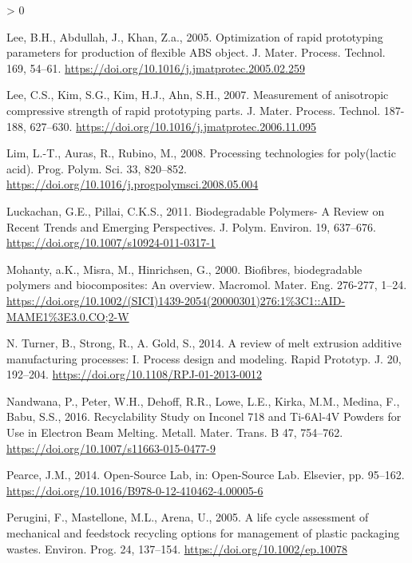 \documentclass[
]{article}
\newlength{\cslhangindent}
\newenvironment{CSLReferences}[2] %
 {%
  \setlength{\parindent}{0pt}
  \ifodd #1 \everypar{\setlength{\hangindent}{\cslhangindent}}\ignorespaces\fi
  \ifnum #2 > 0
  \setlength{\parskip}{#2\baselineskip}
  \fi
 }%
 {}
\begin{document}
\begin{CSLReferences}{1}{0}
\leavevmode\hypertarget{ref-Lee2005}{}%
Lee, B.H., Abdullah, J., Khan, Z.a., 2005. {Optimization of rapid
prototyping parameters for production of flexible ABS object}. J. Mater.
Process. Technol. 169, 54--61.
\url{https://doi.org/10.1016/j.jmatprotec.2005.02.259}

\leavevmode\hypertarget{ref-Lee2007}{}%
Lee, C.S., Kim, S.G., Kim, H.J., Ahn, S.H., 2007. {Measurement of
anisotropic compressive strength of rapid prototyping parts}. J. Mater.
Process. Technol. 187-188, 627--630.
\url{https://doi.org/10.1016/j.jmatprotec.2006.11.095}

\leavevmode\hypertarget{ref-Lim2008}{}%
Lim, L.-T., Auras, R., Rubino, M., 2008. {Processing technologies for
poly(lactic acid)}. Prog. Polym. Sci. 33, 820--852.
\url{https://doi.org/10.1016/j.progpolymsci.2008.05.004}

\leavevmode\hypertarget{ref-Luckachan2011}{}%
Luckachan, G.E., Pillai, C.K.S., 2011. {Biodegradable Polymers- A Review
on Recent Trends and Emerging Perspectives}. J. Polym. Environ. 19,
637--676. \url{https://doi.org/10.1007/s10924-011-0317-1}

\leavevmode\hypertarget{ref-Mohanty2000}{}%
Mohanty, a.K., Misra, M., Hinrichsen, G., 2000. {Biofibres,
biodegradable polymers and biocomposites: An overview}. Macromol. Mater.
Eng. 276-277, 1--24.
\url{https://doi.org/10.1002/(SICI)1439-2054(20000301)276:1\%3C1::AID-MAME1\%3E3.0.CO;2-W}

\leavevmode\hypertarget{ref-NTurner2014}{}%
N. Turner, B., Strong, R., A. Gold, S., 2014. {A review of melt
extrusion additive manufacturing processes: I. Process design and
modeling}. Rapid Prototyp. J. 20, 192--204.
\url{https://doi.org/10.1108/RPJ-01-2013-0012}

\leavevmode\hypertarget{ref-Raugel2015}{}%
Nandwana, P., Peter, W.H., Dehoff, R.R., Lowe, L.E., Kirka, M.M.,
Medina, F., Babu, S.S., 2016. {Recyclability Study on Inconel 718 and
Ti-6Al-4V Powders for Use in Electron Beam Melting}. Metall. Mater.
Trans. B 47, 754--762. \url{https://doi.org/10.1007/s11663-015-0477-9}

\leavevmode\hypertarget{ref-Pearce2014k}{}%
Pearce, J.M., 2014. {Open-Source Lab}, in: Open-Source Lab. Elsevier,
pp. 95--162. \url{https://doi.org/10.1016/B978-0-12-410462-4.00005-6}

\leavevmode\hypertarget{ref-Perugini2005}{}%
Perugini, F., Mastellone, M.L., Arena, U., 2005. {A life cycle
assessment of mechanical and feedstock recycling options for management
of plastic packaging wastes}. Environ. Prog. 24, 137--154.
\url{https://doi.org/10.1002/ep.10078}


\end{CSLReferences}
\end{document}
